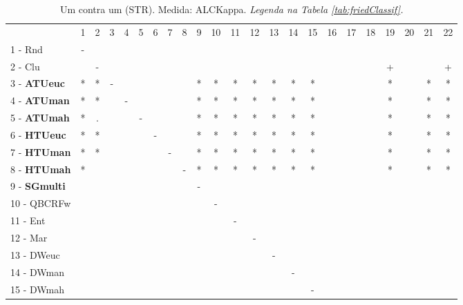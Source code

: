 \begin{table}[h]
\caption{Um contra um (STR). Medida: ALCKappa. \textit{Legenda na Tabela \ref{tab:friedClassif}.}}
\begin{center}\begin{tabular}{lcc|cc|cc|cc|cc|cc|cc|cc|cc|cc|cc}
 			& 1 & 2 & 3 & 4 & 5 & 6 & 7 & 8 & 9 & 10 & 11 & 12 & 13 & 14 & 15 & 16 & 17 & 18 & 19 & 20 & 21 & 22\\
1 - Rnd  	& - &   &   &   &   &   &   &   &   &   &   &   &   &   &   &   &   &   &   &   &   &   \\
2 - Clu  	&   & - &   &   &   &   &   &   &   &   &   &   &   &   &   &   &   &   & + &   &   & + \\ \hline
3 - \textbf{ATUeuc}	& * & * & - &   &   &   &   &   & * & * & * & * & * & * & * &   &   &   & * &   & * & * \\
4 - \textbf{ATUman}	& * & * &   & - &   &   &   &   & * & * & * & * & * & * & * &   &   &   & * &   & * & * \\ \hline
5 - \textbf{ATUmah}	& * & . &   &   & - &   &   &   & * & * & * & * & * & * & * &   &   &   & * &   & * & * \\
6 - \textbf{HTUeuc}	& * & * &   &   &   & - &   &   & * & * & * & * & * & * & * &   &   &   & * &   & * & * \\ \hline
7 - \textbf{HTUman}	& * & * &   &   &   &   & - &   & * & * & * & * & * & * & * &   &   &   & * &   & * & * \\
8 - \textbf{HTUmah}	& * &   &   &   &   &   &   & - & * & * & * & * & * & * & * &   &   &   & * &   & * & * \\ \hline
9 - \textbf{SGmulti}	&   &   &   &   &   &   &   &   & - &   &   &   &   &   &   &   &   &   &   &   &   &   \\
10 - QBCRFw	&   &   &   &   &   &   &   &   &   & - &   &   &   &   &   &   &   &   &   &   &   &   \\ \hline
11 - Ent  	&   &   &   &   &   &   &   &   &   &   & - &   &   &   &   &   &   &   &   &   &   &   \\
12 - Mar  	&   &   &   &   &   &   &   &   &   &   &   & - &   &   &   &   &   &   &   &   &   &   \\ \hline
13 - DWeuc	&   &   &   &   &   &   &   &   &   &   &   &   & - &   &   &   &   &   &   &   &   &   \\
14 - DWman	&   &   &   &   &   &   &   &   &   &   &   &   &   & - &   &   &   &   &   &   &   &   \\ \hline
15 - DWmah	&   &   &   &   &   &   &   &   &   &   &   &   &   &   & - &   &   &   &   &   &   &   \\

\end{tabular}
\end{center}
\end{table}
